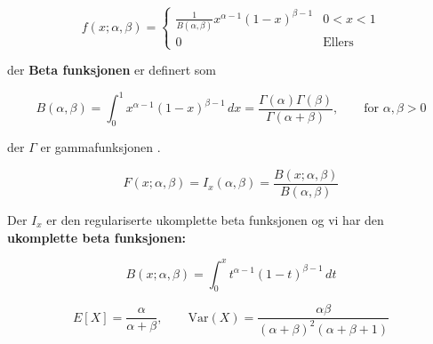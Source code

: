 \begin{equation}
    f(x; \alpha, \beta) = 
    \begin{cases}
        \frac{1}{B(\alpha, \beta)}x^{\alpha - 1}(1 - x)^{\beta - 1} & 0 < x < 1 \\
        0 & \text{Ellers}
    \end{cases}
\end{equation}

der \textbf{Beta funksjonen} er definert som

\begin{equation*}
    B(\alpha, \beta) = \int_0^1 x^{\alpha - 1}(1 - x)^{\beta - 1} \,dx = \frac{\Gamma(\alpha)\Gamma(\beta)}{\Gamma(\alpha + \beta)}, \qquad \text{for } \alpha, \beta > 0
\end{equation*}

der $\Gamma$ er gammafunksjonen \cite{walpole2012probability}. 

\begin{equation}
    F(x; \alpha, \beta) = I_x(\alpha, \beta) = \frac{B(x; \alpha, \beta)}{B(\alpha, \beta)}
\end{equation}

Der $I_x$ er den regulariserte ukomplette beta funksjonen og vi har den \textbf{ukomplette beta funksjonen:}

\begin{equation*}
    B(x; \alpha, \beta) = \int_0^x t^{\alpha-1}(1 - t)^{\beta - 1} \, dt
\end{equation*}

\begin{equation}
    E[X] = \frac{\alpha}{\alpha + \beta}, \qquad \text{Var}(X) = \frac{\alpha\beta}{(\alpha + \beta)^2(\alpha + \beta + 1)}
\end{equation}

